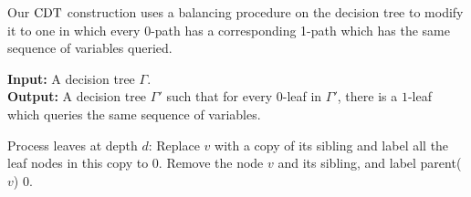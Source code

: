 \documentclass[11pt]{article}
\begin{document}



        

        

Our $\operatorname{CDT}$ construction uses a balancing procedure on the decision tree to modify it to one in which every 0-path has a corresponding 1-path which has the same sequence of variables queried.   

\begin{algorithm}[H]
    \caption{$\BalanceZero(\Gamma)$}
    \label{alg:0-balancing}
    \textbf{Input:} A decision tree $\Gamma$. \\
    \textbf{Output:} A decision tree $\Gamma'$ such that for every $0$-leaf in $\Gamma'$, there is a $1$-leaf which queries the same sequence of variables.
    \begin{algorithmic}[1]
            \State Process leaves at depth $d$:
                    \State Replace $v$ with a copy of its sibling and label all the leaf nodes in this copy to $0$.
                \Else {}
                    \State Remove the node $v$ and its sibling, and label parent($v$) $0$.
                \EndIf
            \EndFor
        \EndFor
    \end{algorithmic}
\end{algorithm}
\end{document}
